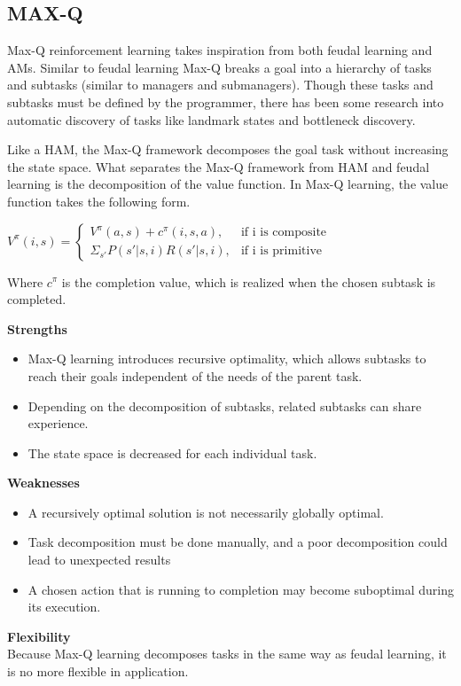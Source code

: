 \subsection{MAX-Q}
Max-Q reinforcement learning takes inspiration from both feudal learning and
AMs. Similar to feudal learning Max-Q breaks a goal into a hierarchy of tasks
and subtasks (similar to managers and submanagers). Though these tasks and
subtasks must be defined by the programmer, there has been some research into
automatic discovery of tasks like landmark states and bottleneck discovery.

Like a HAM, the Max-Q framework decomposes the goal task without increasing
the state space. What separates the Max-Q framework from HAM and feudal
learning is the decomposition of the value function. In Max-Q learning, the
value function takes the following form.

\begin{math}
V^{\pi}(i, s) =
\begin{cases}
V^{\pi}(a, s) + c^{\pi}(i, s, a), & \text{if i is composite}\\
\Sigma_{s'}P(s'|s, i)R(s'|s, i), & \text{if i is primitive}
\end{cases}
\end{math}

Where $c^{\pi}$ is the completion value, which is realized when the chosen
subtask is completed. \cite{Dietterich}

\textbf{Strengths}
\begin{itemize}
    \item Max-Q learning introduces recursive optimality, which allows subtasks	to reach their goals independent of the needs of the parent task.
    \item Depending on the decomposition of subtasks, related subtasks can share experience.
    \item The state space is decreased for each individual task.
\end{itemize}

\textbf{Weaknesses}
\begin{itemize}
    \item A recursively optimal solution is not necessarily globally optimal.
    \item Task decomposition must be done manually, and a poor decomposition could lead to unexpected results
    \item A chosen action that is running to completion may become suboptimal during its execution.
\end{itemize}

\textbf{Flexibility} \\
Because Max-Q learning decomposes tasks in the same way as feudal learning, it is no more flexible in application.

